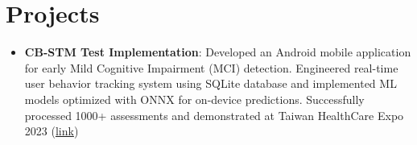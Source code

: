 \documentclass[letterpaper,10pt]{article}
\newcommand{\resumeItem}[2]{
  \item\small{
    \textbf{#1}{: #2 \vspace{-2pt}}
  }
}
\newcommand{\resumeSubItem}[2]{\resumeItem{#1}{#2}\vspace{-4pt}}
\newcommand{\resumeSubHeadingListStart}{\begin{itemize}[leftmargin=*]}
\newcommand{\resumeSubHeadingListEnd}{\end{itemize}}
\newcommand{\shorterSection}[1]{\vspace{-10pt}\section{#1}}
\begin{document}
\shorterSection{\textcolor{titleblue}{Projects}}
  \resumeSubHeadingListStart
    \resumeSubItem{CB-STM Test Implementation}{ Developed an Android mobile application for early Mild Cognitive Impairment (MCI) detection. Engineered real-time user behavior tracking system using SQLite database and implemented ML models optimized with ONNX for on-device predictions. Successfully processed 1000+ assessments and demonstrated at Taiwan HealthCare Expo 2023  (\href{https://www.chinatimes.com/realtimenews/20221205001624-260421?chdtv}{\textcolor{linkblue}{link}})}
    \resumeSubHeadingListEnd
\end{document}
